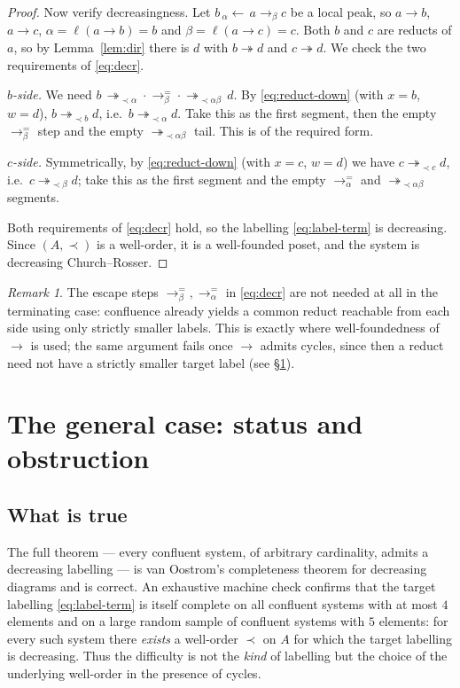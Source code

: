 \documentclass{amsart}
\theoremstyle{definition}
\theoremstyle{remark}
\newtheorem{remark}{Remark}
\newcommand{\redto}{\rightarrow}
\newcommand{\redtt}{\twoheadrightarrow}
\begin{document}
\begin{proof}
Now verify decreasingness.  Let $b\,{}_\alpha{\leftarrow}\,a\redto_\beta c$ be a
local peak, so $a\redto b$, $a\redto c$, $\alpha=\ell(a\redto b)=b$ and
$\beta=\ell(a\redto c)=c$.  Both $b$ and $c$ are reducts of $a$, so by
Lemma~\ref{lem:dir} there is $d$ with $b\redtt d$ and $c\redtt d$.  We check the
two requirements of \eqref{eq:decr}.

\emph{$b$-side.}  We need $b\,\redtt_{\prec\alpha}\cdot\redto^{=}_\beta\cdot
\redtt_{\prec\alpha\beta}\,d$.  By \eqref{eq:reduct-down} (with $x=b$, $w=d$),
$b\redtt_{\prec b}d$, i.e.\ $b\redtt_{\prec\alpha}d$.  Take this as the first
segment, then the empty $\redto^{=}_\beta$ step and the empty
$\redtt_{\prec\alpha\beta}$ tail.  This is of the required form.

\emph{$c$-side.}  Symmetrically, by \eqref{eq:reduct-down} (with $x=c$, $w=d$)
we have $c\redtt_{\prec c}d$, i.e.\ $c\redtt_{\prec\beta}d$; take this as the
first segment and the empty $\redto^{=}_\alpha$ and $\redtt_{\prec\alpha\beta}$
segments.

Both requirements of \eqref{eq:decr} hold, so the labelling
\eqref{eq:label-term} is decreasing.  Since $(A,\prec)$ is a well-order, it is a
well-founded poset, and the system is decreasing Church--Rosser.
\end{proof}

\begin{remark}
The escape steps $\redto^{=}_\beta,\redto^{=}_\alpha$ in \eqref{eq:decr} are not
needed at all in the terminating case: confluence already yields a common
reduct reachable from each side using only strictly smaller labels.  This is
exactly where well-foundedness of $\redto$ is used; the same argument fails once
$\redto$ admits cycles, since then a reduct need not have a strictly smaller
target label (see \S\ref{sec:general}).
\end{remark}

\section{The general case: status and obstruction}\label{sec:general}

\subsection*{What is true}
The full theorem --- every confluent system, of arbitrary cardinality, admits a
decreasing labelling --- is van Oostrom's completeness theorem for decreasing
diagrams and is correct.  An exhaustive machine check confirms that the target
labelling \eqref{eq:label-term} is itself complete on all confluent systems with
at most $4$ elements and on a large random sample of confluent systems with $5$
elements: for every such system there \emph{exists} a well-order $\prec$ on $A$
for which the target labelling is decreasing.  Thus the difficulty is not the
\emph{kind} of labelling but the choice of the underlying well-order in the
presence of cycles.
\end{document}
